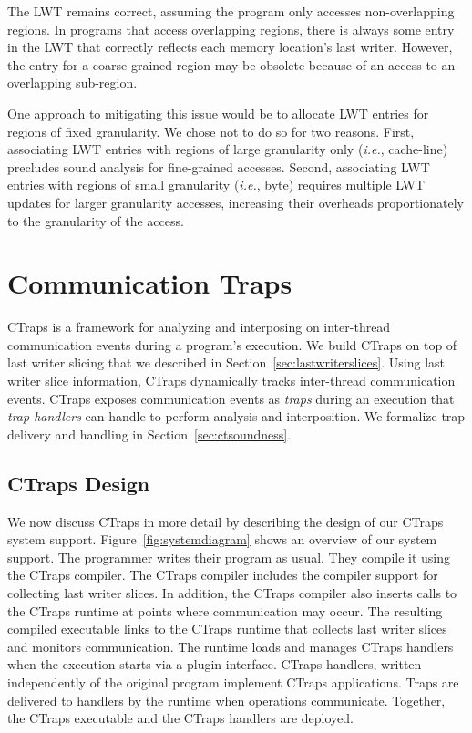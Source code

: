\documentclass[preprint,9pt]{sigplanconf}
\newcommand{\ctraps}{CTraps\xspace}
\newcommand{\lwt}{LWT\xspace}
\begin{document}
The \lwt remains correct, assuming the program only accesses non-overlapping
regions.  In programs that access overlapping regions, there is always some
entry in the \lwt that correctly reflects each memory location's last writer.
However, the entry for a coarse-grained region may be obsolete because of an
access to an overlapping sub-region.

One approach to mitigating this issue would be to allocate \lwt entries for
regions of fixed granularity.  We chose not to do so for two reasons.  First,
associating \lwt entries with regions of  large granularity only ({\em i.e.},
cache-line) precludes sound analysis for fine-grained accesses.  Second,
associating \lwt entries with regions of small granularity ({\em i.e.}, byte)
requires multiple \lwt updates for larger granularity accesses, increasing
their overheads proportionately to the granularity of the access.





\section{Communication Traps}
\label{sec:ctraps}

\ctraps is a framework for analyzing and interposing on inter-thread
communication events during a program's execution.  We build \ctraps on top of
last writer slicing that we described in Section~\ref{sec:lastwriterslices}.
Using last writer slice information, \ctraps dynamically tracks 
inter-thread communication events. \ctraps exposes communication
events as {\em traps} during an execution that {\em trap handlers} can handle
to perform analysis and interposition.  We formalize trap delivery and handling
in Section~\ref{sec:ctsoundness}.

\subsection{\ctraps Design}

We now discuss \ctraps in more detail by describing the design of our \ctraps
system support.  Figure~\ref{fig:systemdiagram} shows an overview of our system
support.  The programmer writes their program as usual.  They compile it using
the \ctraps compiler. The \ctraps compiler includes the compiler support for
collecting last writer slices.  In addition, the \ctraps compiler also inserts
calls to the \ctraps runtime at points where communication may occur.  The
resulting compiled executable links to the \ctraps runtime that collects last
writer slices and monitors communication.  The runtime loads and manages \ctraps
handlers when the execution starts via a plugin interface.  \ctraps handlers,
written independently of the original program implement \ctraps applications.
Traps are delivered to handlers by the runtime when operations communicate.
Together, the \ctraps executable and the \ctraps handlers are deployed.
\end{document}
